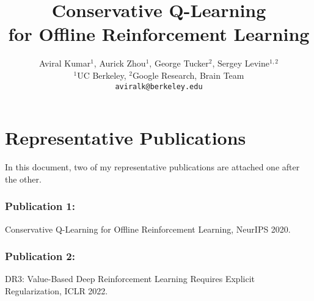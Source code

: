\documentclass{article}
\title{Conservative Q-Learning\\ for Offline Reinforcement Learning}
\author{%
  Aviral Kumar$^1$, Aurick Zhou$^1$, George Tucker$^2$, Sergey Levine$^{1,2}$ \\
  $^1$UC Berkeley, $^2$Google Research, Brain Team\\
  \texttt{aviralk@berkeley.edu}
}
\begin{document}
\part*{Representative Publications}

In this document, two of my representative publications are attached one after the other.

\section*{Publication 1:} 
Conservative Q-Learning for Offline Reinforcement Learning, NeurIPS 2020.

\section*{Publication 2:}
DR3: Value-Based Deep Reinforcement Learning Requires Explicit Regularization, ICLR 2022.





\end{document}
